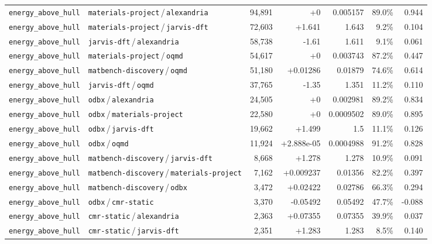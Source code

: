 \begin{longtable}{llrrrrr}
\texttt{energy\_above\_hull} & \texttt{materials-project}\,/\,\texttt{alexandria} & 94{,}891 & +0 & 0.005157 & 89.0\% & 0.944 \\
\texttt{energy\_above\_hull} & \texttt{materials-project}\,/\,\texttt{jarvis-dft} & 72{,}603 & +1.641 & 1.643 & 9.2\% & 0.104 \\
\texttt{energy\_above\_hull} & \texttt{jarvis-dft}\,/\,\texttt{alexandria} & 58{,}738 & -1.61 & 1.611 & 9.1\% & 0.061 \\
\texttt{energy\_above\_hull} & \texttt{materials-project}\,/\,\texttt{oqmd} & 54{,}617 & +0 & 0.003743 & 87.2\% & 0.447 \\
\texttt{energy\_above\_hull} & \texttt{matbench-discovery}\,/\,\texttt{oqmd} & 51{,}180 & +0.01286 & 0.01879 & 74.6\% & 0.614 \\
\texttt{energy\_above\_hull} & \texttt{jarvis-dft}\,/\,\texttt{oqmd} & 37{,}765 & -1.35 & 1.351 & 11.2\% & 0.110 \\
\texttt{energy\_above\_hull} & \texttt{odbx}\,/\,\texttt{alexandria} & 24{,}505 & +0 & 0.002981 & 89.2\% & 0.834 \\
\texttt{energy\_above\_hull} & \texttt{odbx}\,/\,\texttt{materials-project} & 22{,}580 & +0 & 0.0009502 & 89.0\% & 0.895 \\
\texttt{energy\_above\_hull} & \texttt{odbx}\,/\,\texttt{jarvis-dft} & 19{,}662 & +1.499 & 1.5 & 11.1\% & 0.126 \\
\texttt{energy\_above\_hull} & \texttt{odbx}\,/\,\texttt{oqmd} & 11{,}924 & +2.888e-05 & 0.0004988 & 91.2\% & 0.828 \\
\texttt{energy\_above\_hull} & \texttt{matbench-discovery}\,/\,\texttt{jarvis-dft} & 8{,}668 & +1.278 & 1.278 & 10.9\% & 0.091 \\
\texttt{energy\_above\_hull} & \texttt{matbench-discovery}\,/\,\texttt{materials-project} & 7{,}162 & +0.009237 & 0.01356 & 82.2\% & 0.397 \\
\texttt{energy\_above\_hull} & \texttt{matbench-discovery}\,/\,\texttt{odbx} & 3{,}472 & +0.02422 & 0.02786 & 66.3\% & 0.294 \\
\texttt{energy\_above\_hull} & \texttt{odbx}\,/\,\texttt{cmr-static} & 3{,}370 & -0.05492 & 0.05492 & 47.7\% & -0.088 \\
\texttt{energy\_above\_hull} & \texttt{cmr-static}\,/\,\texttt{alexandria} & 2{,}363 & +0.07355 & 0.07355 & 39.9\% & 0.037 \\
\texttt{energy\_above\_hull} & \texttt{cmr-static}\,/\,\texttt{jarvis-dft} & 2{,}351 & +1.283 & 1.283 & 8.5\% & 0.140 \\

\end{longtable}

